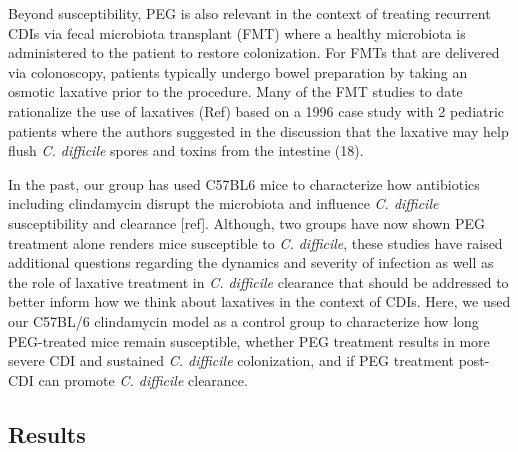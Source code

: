 \documentclass[
  11pt,
]{article}
\begin{document}
Beyond susceptibility, PEG is also relevant in the context of treating
recurrent CDIs via fecal microbiota transplant (FMT) where a healthy
microbiota is administered to the patient to restore colonization. For
FMTs that are delivered via colonoscopy, patients typically undergo
bowel preparation by taking an osmotic laxative prior to the procedure.
Many of the FMT studies to date rationalize the use of laxatives (Ref)
based on a 1996 case study with 2 pediatric patients where the authors
suggested in the discussion that the laxative may help flush \emph{C.
difficile} spores and toxins from the intestine (18).

In the past, our group has used C57BL6 mice to characterize how
antibiotics including clindamycin disrupt the microbiota and influence
\emph{C. difficile} susceptibility and clearance {[}ref{]}. Although,
two groups have now shown PEG treatment alone renders mice susceptible
to \emph{C. difficile}, these studies have raised additional questions
regarding the dynamics and severity of infection as well as the role of
laxative treatment in \emph{C. difficile} clearance that should be
addressed to better inform how we think about laxatives in the context
of CDIs. Here, we used our C57BL/6 clindamycin model as a control group
to characterize how long PEG-treated mice remain susceptible, whether
PEG treatment results in more severe CDI and sustained \emph{C.
difficile} colonization, and if PEG treatment post-CDI can promote
\emph{C. difficile} clearance.

\hypertarget{results}{%
\subsection{Results}\label{results}}
\end{document}
